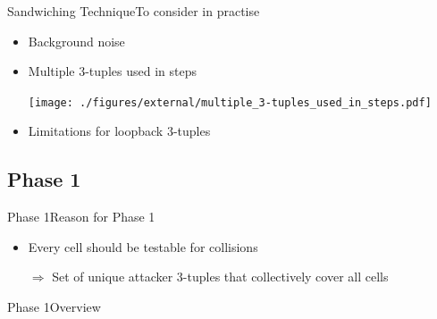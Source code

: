 \documentclass[aspectratio=169, hyperref={colorlinks=true, allcolors=SecondaryColor}, c]{beamer}
\begin{document}
	\begin{frame}[fragile, t]{Sandwiching Technique}{To consider in practise}
		\begin{itemize}
			\item \alert{Background noise}

			\item \alert{Multiple 3-tuples used in steps}

			\texttt{[image: ./figures/external/multiple\_3-tuples\_used\_in\_steps.pdf]} %
			\item \alert{Limitations for loopback 3-tuples}

		\end{itemize}
	\end{frame}
\else
\fi

\ifattackphaseone
	\subsection{Phase 1}

	\begin{frame}[fragile]{Phase 1}{Reason for Phase 1}
		\begin{adjustbox}{max width=\textwidth}
		\end{adjustbox}
		\begin{itemize}
			\item Every cell should be testable for collisions
			\item[\alert{$\Rightarrow$}] Set of \alert{unique attacker 3-tuples} that collectively cover all cells
		\end{itemize}
	\end{frame}

	\begin{frame}[fragile]{Phase 1}{Overview}
		\vspace{0.5cm}

		\begin{adjustbox}{max width=\textwidth}
		\end{adjustbox}
	\end{frame}
\end{document}
